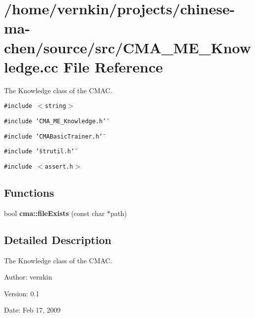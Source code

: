 \section{/home/vernkin/projects/chinese-ma-chen/source/src/CMA\_\-ME\_\-Knowledge.cc File Reference}
\label{CMA__ME__Knowledge_8cc}
The Knowledge class of the CMAC.  


{\tt \#include $<$string$>$}\par
{\tt \#include \char`\"{}CMA\_\-ME\_\-Knowledge.h\char`\"{}}\par
{\tt \#include \char`\"{}CMABasicTrainer.h\char`\"{}}\par
{\tt \#include \char`\"{}strutil.h\char`\"{}}\par
{\tt \#include $<$assert.h$>$}\par
\subsection*{Functions}
\begin{CompactItemize}
\item 
bool \textbf{cma::fileExists} (const char $\ast$path)\label{namespacecma_b1851cbc3cd9a0183ff1d20a8732cf9a}

\end{CompactItemize}


\subsection{Detailed Description}
The Knowledge class of the CMAC. 

\begin{Desc}
\item[Author:]vernkin \end{Desc}
\begin{Desc}
\item[Version:]0.1 \end{Desc}
\begin{Desc}
\item[Date:]Feb 17, 2009 \end{Desc}
